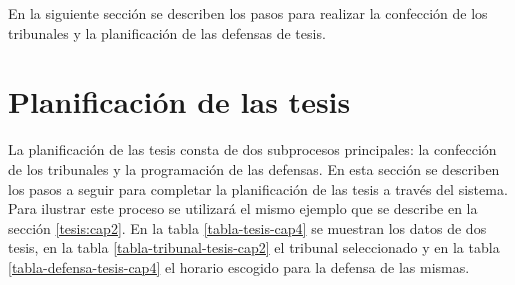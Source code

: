 








En la siguiente sección se describen los pasos para realizar la confección de los 
tribunales y la planificación de las defensas de tesis.

\section{Planificación de las tesis} \label{cap4:tesis}
La planificación de las tesis consta de dos subprocesos principales: la confección de los tribunales 
y la programación de las defensas. 
En esta sección se describen los pasos a seguir para completar 
la planificación de las tesis a través del sistema.
Para ilustrar este proceso se utilizará el mismo ejemplo que se 
describe en la sección \ref{tesis:cap2}. 
En la tabla \ref{tabla-tesis-cap4} se muestran los datos de dos 
tesis, en la tabla \ref{tabla-tribunal-tesis-cap2} el tribunal seleccionado y en 
la tabla \ref{tabla-defensa-tesis-cap4} el horario escogido para la defensa de las mismas.

